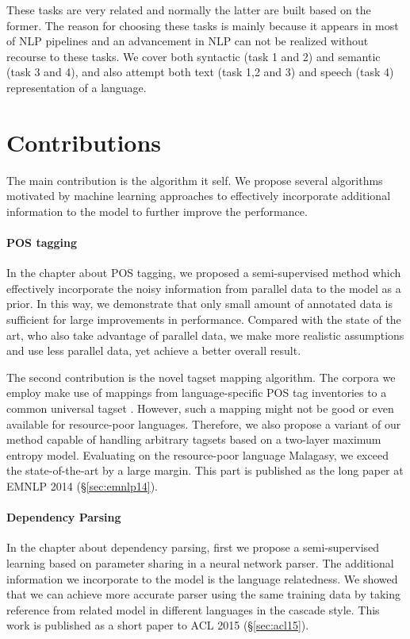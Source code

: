 \documentclass[12pt,twoside,final,hidelinks]{ltthesis}
\theoremstyle{definition}
\newcommand\emnlpiv{EMNLP 2014 (\S\ref{sec:emnlp14})}
\newcommand\aclv{ACL 2015 (\S\ref{sec:acl15})}
\begin{document}
These tasks are very related and normally the latter are built based on the former. 
The reason for choosing these tasks is mainly because it appears in most of NLP pipelines and an advancement in NLP can not be realized without recourse to these tasks. We cover both syntactic (task 1 and 2) and semantic (task 3 and 4), and also attempt both text (task 1,2 and 3) and speech (task 4) representation of a language.  

\section{Contributions}
The main contribution is the algorithm it self. We propose several algorithms motivated by machine learning approaches to effectively incorporate additional information to the model to further improve the performance. 

\paragraph{POS tagging} In the chapter about POS tagging, we proposed a semi-supervised method which effectively incorporate the noisy information from parallel data to the model as a prior. In this way, we demonstrate that only small amount of annotated data is sufficient for large improvements in performance. Compared with the state of the art, who also take advantage of parallel data, we make more realistic assumptions and use less parallel data, yet achieve a better overall result. 

The second contribution is the novel tagset mapping algorithm. The corpora we employ make use of mappings from language-specific POS tag inventories to a common universal tagset \cite{UniversalTagSet}. However, such a mapping might not be good or even available for resource-poor languages. Therefore, we also propose a variant of our method capable of handling arbitrary tagsets based on a two-layer maximum entropy model. Evaluating on the resource-poor language Malagasy, we exceed the state-of-the-art by a large margin. This part is published as the long paper at \emnlpiv. 

\paragraph{Dependency Parsing} In the chapter about dependency parsing, first we propose a semi-supervised learning based on parameter sharing in a neural network parser. The additional information we incorporate to the model is the language relatedness. We showed that we can achieve more accurate parser using the same training data by taking reference from related model in different languages in the cascade style. This work is published as a short paper to \aclv. 
\end{document}
